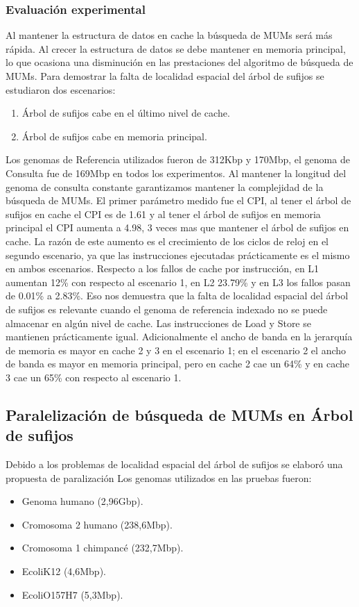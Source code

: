 \documentclass[12pt,a4paper]{article}
\begin{document}
\subsubsection{Evaluación experimental}
\indent
Al mantener la estructura de datos en cache la búsqueda de MUMs será más rápida. Al crecer la estructura de datos se debe mantener en memoria principal, lo que ocasiona una disminución en las prestaciones del algoritmo de búsqueda de MUMs.
Para demostrar la falta de localidad espacial del árbol de sufijos se estudiaron dos escenarios:
\begin{enumerate}
\item Árbol de sufijos cabe en el último nivel de cache.
\item Árbol de sufijos cabe en memoria principal.
\end{enumerate}
Los genomas de Referencia utilizados fueron de 312Kbp y 170Mbp, el genoma de Consulta fue de 169Mbp en todos los experimentos. Al mantener la longitud del genoma de consulta constante garantizamos mantener la complejidad de la búsqueda de MUMs.
El primer parámetro medido fue el CPI, al tener el árbol de sufijos en cache el CPI es de 1.61 y al tener el árbol de sufijos en memoria principal el CPI aumenta a 4.98, 3 veces mas que mantener el árbol de sufijos en cache. La razón de este aumento es el crecimiento de los ciclos de reloj en el segundo escenario, ya que las instrucciones ejecutadas prácticamente es el mismo en ambos escenarios.
Respecto a los fallos de cache por instrucción, en L1 aumentan 12\% con respecto al escenario 1, en L2 23.79\% y en L3 los fallos pasan de 0.01\% a 2.83\%. Eso nos demuestra que la falta de localidad espacial del árbol de sufijos es relevante cuando el genoma de referencia indexado no se puede almacenar en algún nivel de cache. Las instrucciones de Load y Store se mantienen prácticamente igual. Adicionalmente el ancho de banda en la jerarquía de memoria es mayor en cache 2 y 3 en el escenario 1; en el escenario 2 el ancho de banda es mayor en memoria principal, pero en cache 2 cae un 64\% y en cache 3 cae un 65\% con respecto al escenario 1.
\subsection{Paralelización de búsqueda de MUMs en Árbol de sufijos}
Debido a los problemas de localidad espacial del árbol de sufijos se elaboró una propuesta de paralización
\indent
Los genomas utilizados en las pruebas fueron:
\begin{itemize}
\item Genoma humano (2,96Gbp).
\item Cromosoma 2 humano (238,6Mbp).
\item Cromosoma 1 chimpancé (232,7Mbp).
\item EcoliK12 (4,6Mbp).
\item EcoliO157H7 (5,3Mbp).
\end{itemize}
\end{document}
